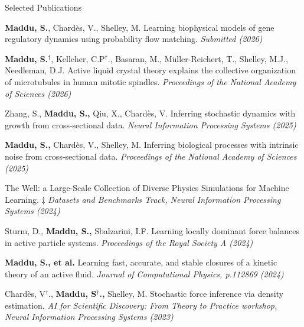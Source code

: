 \documentclass{resume} %
\begin{document}
\begin{rSection}{\small Selected Publications}

\begin{enumerate}[leftmargin=*]
    \item \small \textbf{Maddu, S.}, Chard\`es, V., Shelley, M. Learning biophysical models of gene regulatory dynamics using probability flow matching. \textit{Submitted (2026)} 
    \item \small \textbf{Maddu, S.$^{\dag}$}, Kelleher, C.P$^{\dag}$.,  Basaran, M., Müller-Reichert, T., Shelley, M.J., Needleman, D.J. Active liquid crystal theory explains the collective organization of microtubules in human mitotic spindles. \textit{Proceedings of the National Academy of Sciences (2026)}
    \item \small Zhang, S., \textbf{Maddu, S.,} Qiu, X.,  Chard\`es, V. Inferring stochastic dynamics with growth from cross-sectional data. \textit{Neural Information Processing Systems (2025)}
    \item \small \textbf{Maddu, S.,} Chard\`es, V., Shelley, M. Inferring biological processes with intrinsic noise from cross-sectional data. \textit{Proceedings of the National Academy of Sciences (2025) }
    \item \small The Well: a Large-Scale Collection of Diverse Physics Simulations for Machine Learning. $\ddagger$ \textit{Datasets and Benchmarks Track, Neural Information Processing Systems (2024)}
    \item \small Sturm, D., \textbf{Maddu, S.,} Sbalzarini, I.F. Learning locally dominant force balances in active particle systems. \textit{Proceedings of the Royal Society A (2024)}
    \item \small {\textbf{Maddu, S., et al.} Learning fast, accurate, and stable closures of a kinetic theory of an active fluid. \textit{Journal of Computational Physics, p.112869 (2024)}
    \item \small {Chard\`es, V\:$^\dag$., \textbf{Maddu, S\:$^\dag$.,} Shelley, M. Stochastic force inference via density estimation. \textit{AI for Scientific Discovery: From Theory to Practice workshop, Neural Information Processing Systems (2023)}
}}
\end{enumerate}
\end{rSection}
\end{document}
